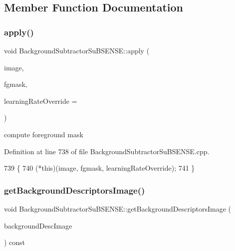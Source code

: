 \subsection{Member Function Documentation}
\mbox{\label{class_background_subtractor_su_b_s_e_n_s_e_adc2a6761d618ea16861ee7a992c154f1}} 
\subsubsection{\texorpdfstring{apply()}{apply()}}
{\footnotesize\ttfamily void Background\+Subtractor\+Su\+B\+S\+E\+N\+S\+E\+::apply (\begin{DoxyParamCaption}\item[{cv\+::\+Input\+Array}]{image,  }\item[{cv\+::\+Output\+Array}]{fgmask,  }\item[{double}]{learning\+Rate\+Override = {} }\end{DoxyParamCaption})\hspace{0.3cm}{\ttfamily [virtual]}}



compute foreground mask 



Definition at line 738 of file Background\+Subtractor\+Su\+B\+S\+E\+N\+S\+E.\+cpp.


\begin{DoxyCode}
739 \{
740     (*this)(image, fgmask, learningRateOverride);
741 \}
\end{DoxyCode}
\mbox{\label{class_background_subtractor_su_b_s_e_n_s_e_a1a6bc447dded20dcce887d7986109ea9}} 
\subsubsection{\texorpdfstring{get\+Background\+Descriptors\+Image()}{getBackgroundDescriptorsImage()}}
{\footnotesize\ttfamily void Background\+Subtractor\+Su\+B\+S\+E\+N\+S\+E\+::get\+Background\+Descriptors\+Image (\begin{DoxyParamCaption}\item[{cv\+::\+Output\+Array}]{background\+Desc\+Image }\end{DoxyParamCaption}) const}



